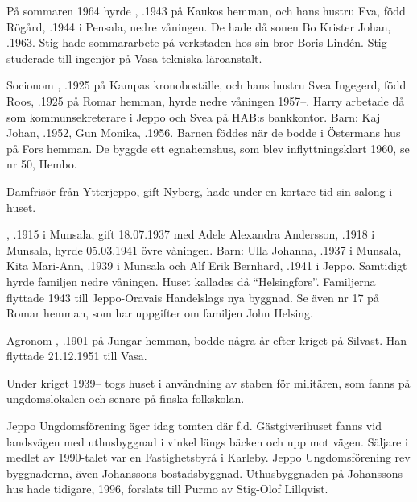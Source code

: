 På sommaren 1964 hyrde , .1943 på Kaukos hemman, och hans hustru Eva, född Rögård, .1944 i Pensala, nedre våningen. De hade då sonen Bo Krister Johan, .1963. Stig hade sommararbete på verkstaden hos sin bror Boris Lindén. Stig studerade till ingenjör på Vasa tekniska läroanstalt.

Socionom , .1925 på Kampas kronoboställe, och hans hustru Svea Ingegerd, född Roos, .1925 på Romar hemman, hyrde nedre våningen 1957--. Harry arbetade då som kommunsekreterare i Jeppo och Svea på HAB:s bankkontor.	Barn:	Kaj Johan, .1952, 	Gun Monika,	.1956.	Barnen föddes när de bodde i Östermans hus på Fors hemman. De byggde ett egnahemshus, som blev inflyttningsklart 1960, se nr 50, Hembo.

Damfrisör  från Ytterjeppo, gift Nyberg, hade under en kortare tid sin salong i huset.

, .1915 i Munsala, gift 18.07.1937 med Adele Alexandra Andersson, .1918 i Munsala, hyrde 05.03.1941  övre våningen. Barn: Ulla Johanna,	.1937 i Munsala, Kita Mari-Ann, .1939 i Munsala och 	Alf Erik Bernhard, .1941 i Jeppo. Samtidigt hyrde familjen  nedre våningen. Huset kallades då ``Helsingfors''. Familjerna flyttade 1943 till Jeppo-Oravais Handelslags nya byggnad. Se även nr 17 på Romar hemman, som har uppgifter om familjen John Helsing.

Agronom , .1901 på Jungar hemman, bodde några år efter kriget på Silvast. Han flyttade 21.12.1951 till Vasa.

Under kriget 1939-- togs huset i användning av staben för militären, som fanns på ungdomslokalen och senare på finska folkskolan.




Jeppo Ungdomsförening äger idag tomten där f.d. Gästgiverihuset	fanns vid landsvägen med uthusbyggnad i vinkel längs bäcken och upp 	mot vägen. Säljare i medlet av 1990-talet var en Fastighetsbyrå i Karleby. Jeppo Ungdomsförening rev byggnaderna, även Johanssons bostadsbyggnad. Uthusbyggnaden på Johanssons hus hade tidigare, 1996, forslats till Purmo av Stig-Olof Lillqvist.



